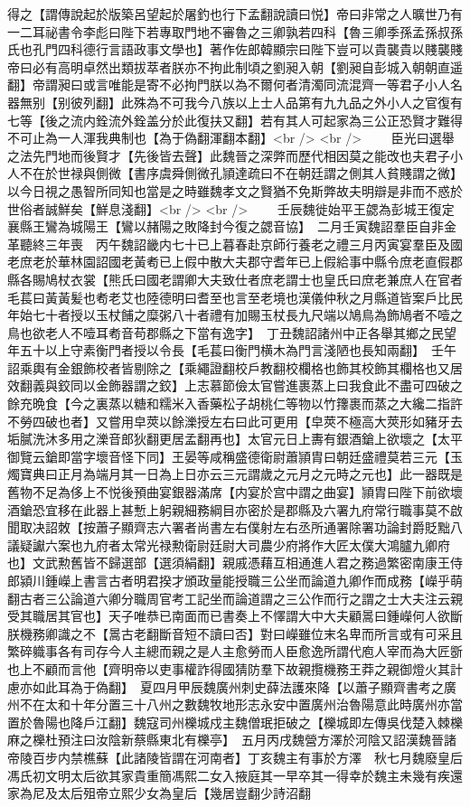 得之【謂傳說起於版築呂望起於屠釣也行下孟翻說讀曰悦】帝曰非常之人曠世乃有一二耳祕書令李彪曰陛下若專取門地不審魯之三卿孰若四科【魯三卿季孫孟孫叔孫氏也孔門四科德行言語政事文學也】著作佐郎韓顯宗曰陛下豈可以貴襲貴以賤襲賤帝曰必有高明卓然出類拔萃者朕亦不拘此制頃之劉昶入朝【劉昶自彭城入朝朝直遥翻】帝謂昶曰或言唯能是寄不必拘門朕以為不爾何者清濁同流混齊一等君子小人名器無别【别彼列翻】此殊為不可我今八族以上士人品第有九九品之外小人之官復有七等【後之流内銓流外銓盖分於此復扶又翻】若有其人可起家為三公正恐賢才難得不可止為一人渾我典制也【為于偽翻渾翻本翻】<br />
<br />
　　臣光曰選舉之法先門地而後賢才【先後皆去聲】此魏晉之深弊而歷代相因莫之能改也夫君子小人不在於世禄與側微【書序虞舜側微孔頴達疏曰不在朝廷謂之側其人貧賤謂之微】以今日視之愚智所同知也當是之時雖魏孝文之賢猶不免斯弊故夫明辯是非而不惑於世俗者誠鮮矣【鮮息淺翻】<br />
<br />
　　壬辰魏徙始平王勰為彭城王復定襄縣王鸞為城陽王【鸞以赭陽之敗降封今復之勰音協】　二月壬寅魏詔羣臣自非金革聽終三年喪　丙午魏詔畿内七十已上暮春赴京師行養老之禮三月丙寅宴羣臣及國老庶老於華林園詔國老黃耇已上假中散大夫郡守耆年已上假給事中縣令庶老直假郡縣各賜鳩杖衣裳【熊氏曰國老謂卿大夫致仕者庶老謂士也皇氏曰庶老兼庶人在官者毛萇曰黃黃髪也耇老艾也陸德明曰耆至也言至老境也漢儀仲秋之月縣道皆案戶比民年始七十者授以玉杖餔之糜粥八十者禮有加賜玉杖長九尺端以鳩鳥為飾鳩者不噎之鳥也欲老人不噎耳耇音苟郡縣之下當有逸字】　丁丑魏詔諸州中正各舉其鄉之民望年五十以上守素衡門者授以令長【毛萇曰衡門横木為門言淺陋也長知兩翻】　壬午詔乘輿有金銀飾校者皆剔除之【乘繩證翻校戶教翻校欄格也飾其校飾其欄格也又居效翻義與鉸同以金飾器謂之鉸】上志慕節儉太官嘗進裹蒸上曰我食此不盡可四破之餘充晩食【今之裏蒸以糖和糯米入香藥松子胡桃仁等物以竹籜裹而蒸之大纔二指許不勞四破也者】又嘗用皁莢以餘濼授左右曰此可更用【皁莢不極高大莢形如豬牙去垢膩洗沐多用之濼音郎狄翻更居孟翻再也】太官元日上夀有銀酒鎗上欲壞之【太平御覽云鎗即當字壞音怪下同】王晏等咸稱盛德衛尉蕭頴胄曰朝廷盛禮莫若三元【玉燭寶典曰正月為端月其一日為上日亦云三元謂歲之元月之元時之元也】此一器既是舊物不足為侈上不悦後預曲宴銀器滿席【内宴於宫中謂之曲宴】頴胄曰陛下前欲壞酒鎗恐宜移在此器上甚慙上躬親細務綱目亦密於是郡縣及六署九府常行職事莫不啟聞取决詔敇【按蕭子顯齊志六署者尚書左右僕射左右丞所通署除署功論封爵貶黜八議疑讞六案也九府者太常光禄勲衛尉廷尉大司農少府將作大匠太僕大鴻臚九卿府也】文武勲舊皆不歸選部【選須絹翻】親戚憑藉互相通進人君之務過繁密南康王侍郎潁川鍾嶸上書言古者明君揆才頒政量能授職三公坐而論道九卿作而成務【嶸乎萌翻古者三公論道六卿分職周官考工記坐而論道謂之三公作而行之謂之士大夫注云親受其職居其官也】天子唯恭已南面而已書奏上不懌謂大中大夫顧暠曰鍾嶸何人欲斷朕機務卿識之不【暠古老翻斷音短不讀曰否】對曰嶸雖位末名卑而所言或有可采且繁碎軄事各有司存今人主總而親之是人主愈勞而人臣愈逸所謂代庖人宰而為大匠斵也上不顧而言他【齊明帝以吏事權詐得國猜防羣下故親攬機務王莽之親御燈火其計慮亦如此耳為于偽翻】　夏四月甲辰魏廣州刺史薛法護來降【以蕭子顯齊書考之廣州不在太和十年分置三十八州之數魏牧地形志永安中置廣州治魯陽意此時廣州亦當置於魯陽也降戶江翻】魏寇司州櫟城戍主魏僧珉拒破之【櫟城即左傳吳伐楚入棘櫟麻之櫟杜預注曰汝陰新蔡縣東北有櫟亭】　五月丙戌魏營方澤於河陰又詔漢魏晉諸帝陵百步内禁樵蘇【此諸陵皆謂在河南者】丁亥魏主有事於方澤　秋七月魏廢皇后馮氏初文明太后欲其家貴重簡馮熙二女入掖庭其一早卒其一得幸於魏主未幾有疾還家為尼及太后殂帝立熙少女為皇后【幾居豈翻少詩沼翻